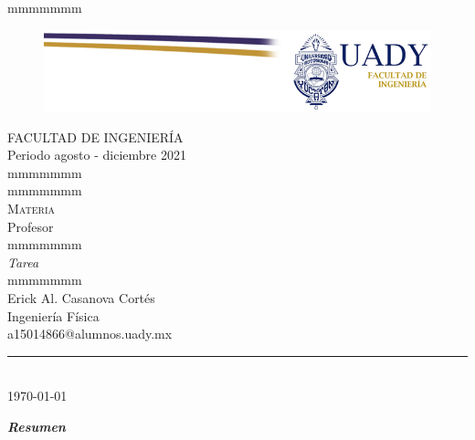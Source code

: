 \documentclass[letterpaper, 12pt]{article}
\begin{document}
\begin{center}
\begin{Large}
{\color{white} mmmmmmm} \bigskip\\
\begin{figure}[H]	
\centering
\includegraphics[scale=0.9]{bannerfiuady.png}
\end{figure}\bigskip
\textsc{FACULTAD DE INGENIERÍA}\bigskip\\
Periodo agosto - diciembre 2021 \bigskip\\
{\color{white} mmmmmmm} \\
{\color{white} mmmmmmm} \bigskip\\
\textsc{Materia} \bigskip\\
Profesor \\
{\color{white} mmmmmmm} \bigskip\\
\textsl{Tarea } \bigskip\\
{\color{white} mmmmmmm} \bigskip\\
Erick Al. Casanova Cortés\\

\normalsize
Ingeniería Física\\
\small
a15014866@alumnos.uady.mx\\
\Large
\rule{0.5\paperwidth}{0.5pt} \\ \bigskip
{\AdvanceDate\today}
\end{Large}
\end{center}
\newpage


\setcounter{page}{1}


\tableofcontents
\listoffigures
\listoftables

\newpage
{}





\Large
\textit{ \textbf{Resumen}}
\normalsize
\end{document}
